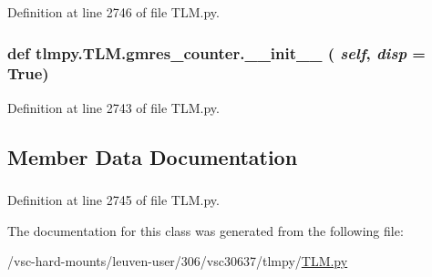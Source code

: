 Definition at line 2746 of file TLM.py.\hypertarget{classtlmpy_1_1TLM_1_1gmres__counter_a41615401fca2f1153168701d66c18da9}{
\subsubsection[{\_\-\_\-init\_\-\_\-}]{\setlength{\rightskip}{0pt plus 5cm}def tlmpy.TLM.gmres\_\-counter.\_\-\_\-init\_\-\_\- ( {\em self}, \/   {\em disp} = {\ttfamily True})}}
\label{classtlmpy_1_1TLM_1_1gmres__counter_a41615401fca2f1153168701d66c18da9}


Definition at line 2743 of file TLM.py.

\subsection{Member Data Documentation}
\hypertarget{classtlmpy_1_1TLM_1_1gmres__counter_af98b42fd7b48019d2a033c9512982f04}{
\subsubsection[{niter}]{}}
\label{classtlmpy_1_1TLM_1_1gmres__counter_af98b42fd7b48019d2a033c9512982f04}


Definition at line 2745 of file TLM.py.

The documentation for this class was generated from the following file:\begin{DoxyCompactItemize}
\item 
/vsc-\/hard-\/mounts/leuven-\/user/306/vsc30637/tlmpy/\hyperlink{TLM_8py}{TLM.py}\end{DoxyCompactItemize}
